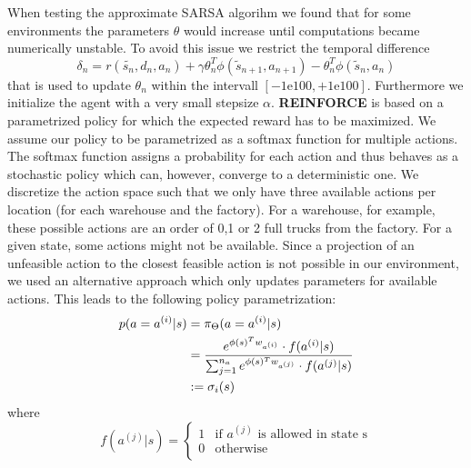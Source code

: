 \documentclass[journal, a4paper]{IEEEtran}
\theoremstyle{plain}
\theoremstyle{definition}
\begin{document}
When testing the approximate SARSA algorihm we found that for some environments the parameters $\theta$ would increase until computations became numerically unstable. To avoid this issue we restrict the temporal difference
\begin{equation}
	\delta_n = r(\tilde{s_n}, d_n, a_n) + \gamma \theta_n^T \phi(\tilde{s}_{n+1}, a_{n+1}) - \theta_n^T\phi(\tilde{s}_n, a_n)
\end{equation}
that is used to update $\theta_n$ within the intervall $[-1\mathrm{e}{100}, +1\mathrm{e}{100}]$. Furthermore we initialize the agent with a very small stepsize $\alpha$. 
\textbf{REINFORCE} is based on a parametrized policy for which the expected reward has to be maximized. We assume our policy to be parametrized as a softmax function for multiple actions. The softmax function assigns a probability for each action and thus behaves as a stochastic policy which can, however, converge to a deterministic one. 
We discretize the action space such that we only have three available actions per location (for each warehouse and the factory). For a warehouse, for example, these possible actions are an order of  0,1 or 2 full trucks from the factory. For a given state, some actions might not be available. Since a projection of an unfeasible action to the closest feasible action is not possible in our environment, we used an alternative approach which only updates parameters for available actions. 
This leads to the following policy parametrization:
\begin{equation}
    \label{simple_equation}
    \begin{split}
    p( a = a^{(i)}| s)& =  \pi_\Theta(a = a^{(i)}|s) 
    \notag
    \\
     & =\frac{e^{\phi(s)^T w_{a^{(i)}}}\cdot f(a^{(i)}|s)}{\sum_{j=1}^{n_a} e^{\phi(s)^T w_{a^{(j)}}}\cdot f(a^{(j)}|s)}\\ 
     & :=
     \sigma_i(s)
     \end{split}
\end{equation}
where 
\begin{equation}
   f(a^{(j)}|s) =
   \begin{cases}
     1 & \text{if $a^{(j)}$ is allowed in state s} \\
     0 & \text{otherwise} \\ 
   \end{cases}
\end{equation}
\end{document}
